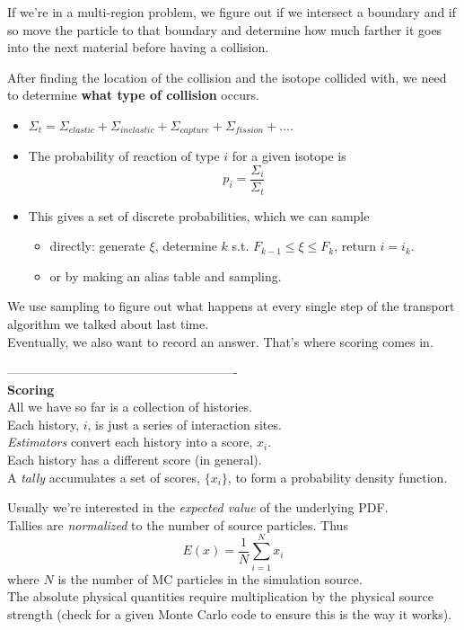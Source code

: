\documentclass[12pt]{article}
\begin{document}
%
If we're in a multi-region problem, we figure out if we intersect a boundary and if so move the particle to that boundary and determine how much farther it goes into the next material before having a collision.

After finding the location of the collision and the isotope collided with, we need to determine \textbf{what type of collision} occurs. 
%
\begin{itemize}
\item $\Sigma_t = \Sigma_{elastic} + \Sigma_{inelastic} + \Sigma_{capture} + \Sigma_{fission} + \dots$.
%
\item The probability of reaction of type $i$ for a given isotope is 
\[p_i = \frac{\Sigma_i}{\Sigma_t}\]
%
\item This gives a set of discrete probabilities, which we can sample 
\begin{itemize}
\item directly: generate $\xi$, determine $k$ s.t. $F_{k-1} \leq \xi \le F_k$, return $i = i_k$.
%
\item or by making an alias table and sampling.
\end{itemize}
\end{itemize}

We use sampling to figure out what happens at every single step of the transport algorithm we talked about last time.\\
Eventually, we also want to record an answer. That's where scoring comes in.

\vspace*{1 em}
-------------------------------------------------------\\
\textbf{Scoring}\\
All we have so far is a collection of histories.\\
Each history, $i$, is just a series of interaction sites.\\
\textit{Estimators} convert each history into a score, $x_i$. \\
Each history has a different score (in general).\\
A \textit{tally} accumulates a set of scores, $\{x_i\}$, to form a probability density function.

Usually we're interested in the \textit{expected value} of the underlying PDF. \\
Tallies are \textit{normalized} to the number of source particles. Thus
\[
E(x) = \frac{1}{N} \sum_{i=1}^N x_i
\]
where $N$ is the number of MC particles in the simulation source.\\
The absolute physical quantities require multiplication by the physical source strength (check for a given Monte Carlo code to ensure this is the way it works). 
\end{document}
